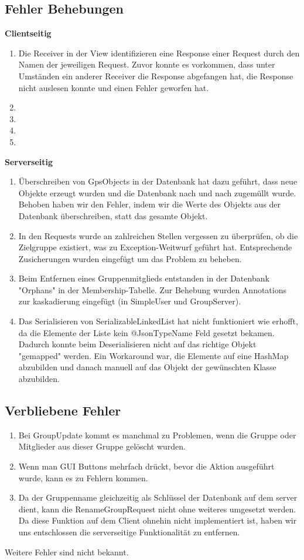\subsection{Fehler Behebungen}
	\textbf{Clientseitig}
	\begin{enumerate}
		\item Die Receiver in der View identifizieren eine Response einer Request durch den Namen der jeweiligen Request. Zuvor konnte es vorkommen, dass unter Umständen ein anderer Receiver die Response abgefangen hat, die Response nicht auslesen konnte und einen Fehler geworfen hat.
		\item
		\item
		\item
		\item
	\end{enumerate}

	\textbf{Serverseitig}
	\begin{enumerate}
		\item Überschreiben von GpsObjects in der Datenbank hat dazu geführt, dass neue Objekte erzeugt wurden und die Datenbank nach und nach zugemüllt wurde. Behoben haben wir den Fehler, indem wir die Werte des Objekts aus der Datenbank überschreiben, statt das gesamte Objekt.
		\item In den Requests wurde an zahlreichen Stellen vergessen zu überprüfen, ob die Zielgruppe existiert, was zu Exception-Weitwurf geführt hat. Entsprechende Zusicherungen wurden eingefügt um das Problem zu beheben.
          \item Beim Entfernen eines Gruppenmitglieds entstanden in der Datenbank "Orphans" in der Membership-Tabelle. Zur Behebung wurden Annotations zur kaskadierung eingefügt (in SimpleUser und GroupServer).
		\item Das Serialisieren von SerializableLinkedList hat nicht funktioniert wie erhofft, da die Elemente der Liste kein @JsonTypeName Feld gesetzt bekamen. Dadurch konnte beim Deserialisieren nicht auf das richtige Objekt "gemapped" werden. Ein Workaround war, die Elemente auf eine HashMap abzubilden und danach manuell auf das Objekt der gewünschten Klasse abzubilden.
	\end{enumerate}

\subsection{Verbliebene Fehler}
	\begin{enumerate}
		\item Bei GroupUpdate kommt es manchmal zu Problemen, wenn die Gruppe oder Mitglieder aus dieser Gruppe gelöscht wurden.
		\item Wenn man GUI Buttons mehrfach drückt, bevor die Aktion ausgeführt wurde, kann es zu Fehlern kommen.
		\item Da der Gruppenname gleichzeitig als Schlüssel der Datenbank auf dem server dient, kann die RenameGroupRequest nicht ohne weiteres umgesetzt werden. Da diese Funktion auf dem Client ohnehin nicht implementiert ist, haben wir uns entschlossen die serverseitige Funktionalität zu entfernen.
	\end{enumerate}

	Weitere Fehler sind nicht bekannt.
